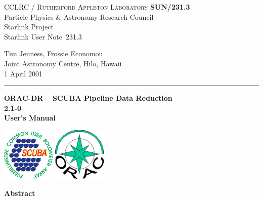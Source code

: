 \documentclass[twoside,11pt]{article}
\newcommand{\stardoccategory}  {Starlink User Note}
\newcommand{\stardocinitials}  {SUN}
\newcommand{\stardocnumber}    {231.3}
\newcommand{\stardocauthors}   {Tim Jenness, Frossie Economou\\
Joint Astronomy Centre, Hilo, Hawaii}
\newcommand{\stardocdate}      {1 April 2001}
\newcommand{\stardoctitle}     {ORAC-DR -- SCUBA Pipeline Data Reduction}
\newcommand{\stardocversion}   {2.1-0}
\newcommand{\stardocmanual}    {User's Manual}
\newcommand{\stardocname}{\stardocinitials /\stardocnumber}
\newenvironment{latexonly}{}{}
\renewcommand{\_}{\texttt{\symbol{95}}}
\begin{document}
\thispagestyle{empty}

\begin{latexonly}
   CCLRC / \textsc{Rutherford Appleton Laboratory} \hfill \textbf{\stardocname}\\
   {\large Particle Physics \& Astronomy Research Council}\\
   {\large Starlink Project\\}
   {\large \stardoccategory\ \stardocnumber}
   \begin{flushright}
   \stardocauthors\\
   \stardocdate
   \end{flushright}
   \vspace{-4mm}
   \rule{\textwidth}{0.5mm}
   \vspace{5mm}
   \begin{center}
   {\Huge\textbf{\stardoctitle \\ [2.5ex]}}
   {\LARGE\textbf{\stardocversion \\ [4ex]}}
   {\Huge\textbf{\stardocmanual}}
   \end{center}
   \vspace{5mm}

\begin{center}
\includegraphics[width=1.0in]{sun231_sculogo.eps}
\hskip 1.0in
\includegraphics[width=1.0in]{sun231_logo.eps}
\end{center}

   \vspace{10mm}
   \begin{center}
      {\Large\textbf{Abstract}}
   \end{center}
\end{latexonly}
\end{document}
